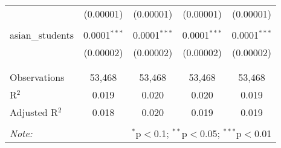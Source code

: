 \begin{table}[!htbp]
\begin{tabular}{@{\extracolsep{-2pt}}lcccc}
  & (0.00001) & (0.00001) & (0.00001) & (0.00001) \\ 
  & & & & \\ 
 asian\_students & 0.0001$^{***}$ & 0.0001$^{***}$ & 0.0001$^{***}$ & 0.0001$^{***}$ \\ 
  & (0.00002) & (0.00002) & (0.00002) & (0.00002) \\ 
  & & & & \\ 
\hline \\[-1.8ex] 
Observations & 53,468 & 53,468 & 53,468 & 53,468 \\ 
R$^{2}$ & 0.019 & 0.020 & 0.020 & 0.019 \\ 
Adjusted R$^{2}$ & 0.018 & 0.020 & 0.019 & 0.019 \\ 
\hline 
\hline \\[-1.8ex] 
\textit{Note:}  & \multicolumn{4}{r}{$^{*}$p$<$0.1; $^{**}$p$<$0.05; $^{***}$p$<$0.01} \\ 
\end{tabular} 
\end{table} 
